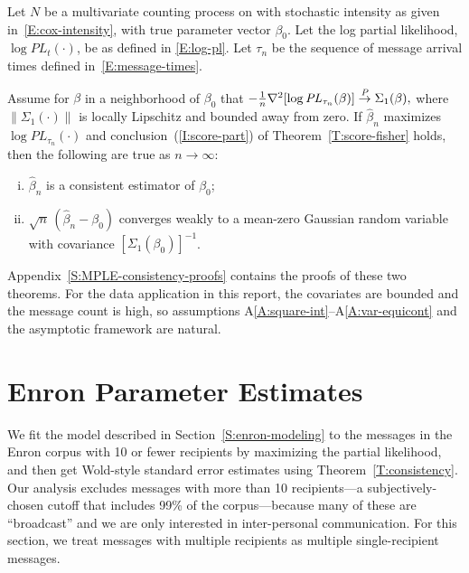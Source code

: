 \documentclass[aoas,preprint]{imsart}
\begin{document}
\begin{theorem}\label{T:consistency}
    Let $N$ be a multivariate counting process on with stochastic
    intensity as given in~\eqref{E:cox-intensity}, with true parameter
    vector $\beta_0$.  Let the log partial likelihood,
    $\log \mathit{PL}_t(\cdot)$, be as defined in \eqref{E:log-pl}.
    Let $\tau_n$ be the sequence of message arrival times defined
    in~\eqref{E:message-times}.
    
    Assume for $\beta$ in a
    neighborhood of $\beta_0$ that
    \(
        -\tfrac{1}{n} \nabla^2 [ \log \mathit{PL}_{\tau_n}(\beta)]
            \overset{\mathit{P}}{\to} \Sigma_1(\beta),
    \)
    where $\| \Sigma_1(\cdot) \|$ is locally Lipschitz and bounded
    away from zero.
    If $\hat \beta_n$ maximizes $\log \mathit{PL}_{\tau_n}(\cdot)$ and
    conclusion~(\ref{I:score-part}) of Theorem~\ref{T:score-fisher} holds,
    then the following are true as $n\to\infty$:
    \begin{enumerate}[(i)]
        \item $\hat \beta_n$ is a consistent estimator of $\beta_0$;
        \item $\sqrt{n} \, (\hat \beta_n - \beta_0)$ converges weakly
            to a mean-zero Gaussian random variable with covariance
            $[\Sigma_1(\beta_0)]^{-1}$.
    \end{enumerate}
\end{theorem}

Appendix~\ref{S:MPLE-consistency-proofs} contains the proofs of
these two theorems.  For the data application in this report,
the covariates are bounded and the message count is high, so 
assumptions A\ref{A:square-int}--A\ref{A:var-equicont} and
the asymptotic framework are natural.  


\section{Enron Parameter Estimates}\label{S:enron-estimates}

We fit the model described in Section~\ref{S:enron-modeling} to
the messages in the Enron corpus with 10 or fewer recipients by
maximizing the partial likelihood, and then get Wold-style standard
error estimates using Theorem~\ref{T:consistency}.  Our analysis excludes
messages with more than 10 recipients---a subjectively-chosen cutoff that
includes 99\% of the corpus---because many of these are ``broadcast'' and
we are only interested in inter-personal communication.  For this section,
we treat messages with multiple recipients as multiple single-recipient
messages.  
\end{document}
